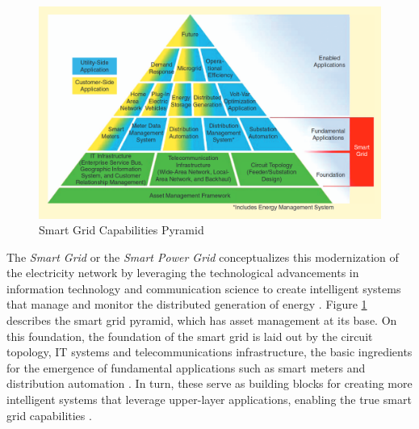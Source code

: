 \begin{figure}[h!]
	\centering
	\includegraphics[width=0.74\linewidth]{./figures/smart_grid.png}
	\caption{Smart Grid Capabilities Pyramid \cite{farhangiPathSmartGrid2010}}
	\label{fig:smart-grid}
\end{figure}


The \textit{Smart Grid} or the \textit{Smart Power Grid} conceptualizes this modernization of the electricity network by leveraging the technological advancements in information technology and communication science to create intelligent systems that manage and monitor the distributed generation of energy \cite{bayindirSmartGridTechnologies2016, farhangiPathSmartGrid2010}. Figure \ref{fig:smart-grid} describes the smart grid pyramid, which has asset management at its base. On this foundation, the foundation of the smart grid is laid out by the circuit topology, \acs{IT} systems and telecommunications infrastructure, the basic ingredients for the emergence of fundamental applications such as smart meters and distribution automation \cite{farhangiPathSmartGrid2010}. In turn, these serve as building blocks for creating more intelligent systems that leverage upper-layer applications, enabling the true smart grid capabilities \cite{farhangiPathSmartGrid2010}.
